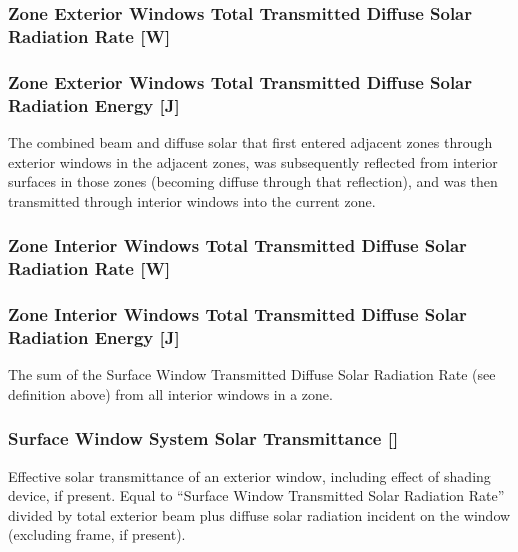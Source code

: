 \subsubsection{Zone Exterior Windows Total Transmitted Diffuse Solar Radiation Rate {[}W{]}}\label{zone-exterior-windows-total-transmitted-diffuse-solar-radiation-rate-w}

\subsubsection{Zone Exterior Windows Total Transmitted Diffuse Solar Radiation Energy {[}J{]}}\label{zone-exterior-windows-total-transmitted-diffuse-solar-radiation-energy-j}

The combined beam and diffuse solar that first entered adjacent zones through exterior windows in the adjacent zones, was subsequently reflected from interior surfaces in those zones (becoming diffuse through that reflection), and was then transmitted through interior windows into the current zone.

\subsubsection{Zone Interior Windows Total Transmitted Diffuse Solar Radiation Rate {[}W{]}}\label{zone-interior-windows-total-transmitted-diffuse-solar-radiation-rate-w}

\subsubsection{Zone Interior Windows Total Transmitted Diffuse Solar Radiation Energy {[}J{]}}\label{zone-interior-windows-total-transmitted-diffuse-solar-radiation-energy-j}

The sum of the Surface Window Transmitted Diffuse Solar Radiation Rate (see definition above) from all interior windows in a zone.

\subsubsection{Surface Window System Solar Transmittance {[]}}\label{surface-window-system-solar-transmittance}

Effective solar transmittance of an exterior window, including effect of shading device, if present. Equal to ``Surface Window Transmitted Solar Radiation Rate'' divided by total exterior beam plus diffuse solar radiation incident on the window (excluding frame, if present).

